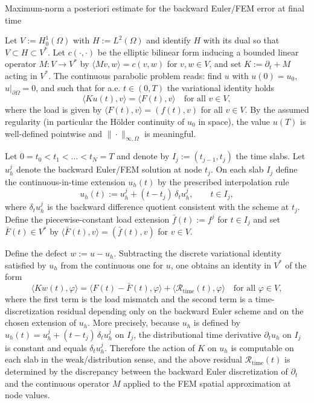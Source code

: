 \documentclass[11pt]{article}
\begin{document}
Maximum-norm a posteriori estimate for the backward Euler/FEM error at final time

Let \(V:=H^1_0(\Omega)\) with \(H:=L^2(\Omega)\) and identify \(H\) with its dual so that \(V\subset H\subset V^*\). Let \(c(\cdot,\cdot)\) be the elliptic bilinear form inducing a bounded linear operator \(M:V\to V^*\) by \(\langle Mv,w\rangle=c(v,w)\) for \(v,w\in V\), and set \(K:=\partial_t+M\) acting in \(V^*\). The continuous parabolic problem reads: find \(u\) with \(u(0)=u_0\), \(u|_{\partial\Omega}=0\), and such that for a.e. \(t\in(0,T)\) the variational identity holds
\[
\langle Ku(t),v\rangle=\langle F(t),v\rangle\quad\text{for all }v\in V,
\]
where the load is given by \(\langle F(t),v\rangle=(f(t),v)\) for all \(v\in V\). By the assumed regularity (in particular the Hölder continuity of \(u_0\) in space), the value \(u(T)\) is well-defined pointwise and \(\|\cdot\|_{\infty,\Omega}\) is meaningful.

Let \(0=t_0<t_1<\dots<t_N=T\) and denote by \(I_j:=(t_{j-1},t_j)\) the time slabs. Let \(u_h^j\) denote the backward Euler/FEM solution at node \(t_j\). On each slab \(I_j\) define the continuous-in-time extension \(u_h(t)\) by the prescribed interpolation rule
\[
u_h(t):=u_h^j+(t-t_j)\,\delta_t u_h^j,\qquad t\in I_j,
\]
where \(\delta_t u_h^j\) is the backward difference quotient consistent with the scheme at \(t_j\). Define the piecewise-constant load extension \(\bar f(t):=f^j\) for \(t\in I_j\) and set \(\bar F(t)\in V^*\) by \(\langle \bar F(t),v\rangle=(\bar f(t),v)\) for \(v\in V\).

Define the defect \(w:=u-u_h\). Subtracting the discrete variational identity satisfied by \(u_h\) from the continuous one for \(u\), one obtains an identity in \(V^*\) of the form
\[
\langle Kw(t),\varphi\rangle=\langle F(t)-\bar F(t),\varphi\rangle+\langle\mathcal R_{\mathrm{time}}(t),\varphi\rangle\quad\text{for all }\varphi\in V,
\]
where the first term is the load mismatch and the second term is a time-discretization residual depending only on the backward Euler scheme and on the chosen extension of \(u_h\). More precisely, because \(u_h\) is defined by \(u_h(t)=u_h^j+(t-t_j)\,\delta_t u_h^j\) on \(I_j\), the distributional time derivative \(\partial_t u_h\) on \(I_j\) is constant and equals \(\delta_t u_h^j\). Therefore the action of \(K\) on \(u_h\) is computable on each slab in the weak/distribution sense, and the above residual \(\mathcal R_{\mathrm{time}}(t)\) is determined by the discrepancy between the backward Euler discretization of \(\partial_t\) and the continuous operator \(M\) applied to the FEM spatial approximation at node values.
\end{document}
